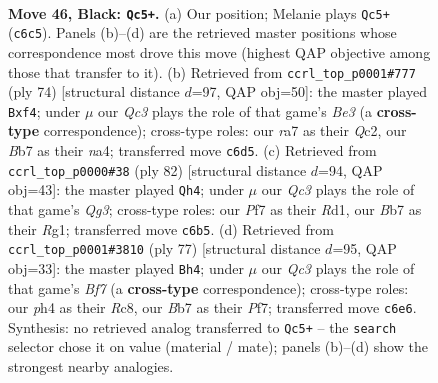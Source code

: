 \documentclass[11pt]{article}
\begin{document}
\clearpage

\begin{figure}[p]\centering
\begin{subfigure}{0.46\textwidth}\centering
\resizebox{\linewidth}{!}{%
\newchessgame
\chessboard[
  setfen={1r2r3/Rb3p1k/1pq2Bp1/8/7P/1P3Q2/2PN4/R2B2K1 b - - 6 46},
  showmover=false,
  pgfstyle=straightmove, color=movearrow, markmove={c6-c5}
]}
\caption{}
\end{subfigure}\hfill
\begin{subfigure}{0.46\textwidth}\centering
\resizebox{\linewidth}{!}{%
\newchessgame
\chessboard[
  setfen={r3r1k1/1R6/3ppq1p/8/n1P1Pb2/4B3/2Q3B1/1R4K1 w - - 0 38},
  showmover=false,
  pgfstyle=straightmove, color=movearrow, markmove={e3-f4}
]}
\caption{}
\end{subfigure}
\\[4pt]
\begin{subfigure}{0.46\textwidth}\centering
\resizebox{\linewidth}{!}{%
\newchessgame
\chessboard[
  setfen={5r1k/2p3b1/7p/p3q3/P1B5/2P2pQ1/1r3P1P/3R2RK w - - 15 42},
  showmover=false,
  pgfstyle=straightmove, color=movearrow, markmove={g3-h4}
]}
\caption{}
\end{subfigure}\hfill
\begin{subfigure}{0.46\textwidth}\centering
\resizebox{\linewidth}{!}{%
\newchessgame
\chessboard[
  setfen={r1r3k1/5pp1/p2p4/3P3q/Pp2P3/5R2/R1B1NbK1/3Q4 b - - 1 39},
  showmover=false,
  pgfstyle=straightmove, color=movearrow, markmove={f2-h4}
]}
\caption{}
\end{subfigure}
\caption{\textbf{Move 46, Black: \texttt{Qc5+}.} (a) Our position; Melanie plays \texttt{Qc5+} (\texttt{c6c5}). Panels (b)--(d) are the retrieved master positions whose correspondence most drove this move (highest QAP objective among those that transfer to it). (b) Retrieved from \texttt{ccrl\_top\_p0001\#777} (ply 74) [structural distance $d$=97, QAP obj=50]: the master played \texttt{Bxf4}; under $\mu$ our \emph{Qc3} plays the role of that game's \emph{Be3} (a \textbf{cross-type} correspondence); cross-type roles: our \emph{r}a7 as their \emph{Q}c2, our \emph{B}b7 as their \emph{n}a4; transferred move \texttt{c6d5}. (c) Retrieved from \texttt{ccrl\_top\_p0000\#38} (ply 82) [structural distance $d$=94, QAP obj=43]: the master played \texttt{Qh4}; under $\mu$ our \emph{Qc3} plays the role of that game's \emph{Qg3}; cross-type roles: our \emph{P}f7 as their \emph{R}d1, our \emph{B}b7 as their \emph{R}g1; transferred move \texttt{c6b5}. (d) Retrieved from \texttt{ccrl\_top\_p0001\#3810} (ply 77) [structural distance $d$=95, QAP obj=33]: the master played \texttt{Bh4}; under $\mu$ our \emph{Qc3} plays the role of that game's \emph{Bf7} (a \textbf{cross-type} correspondence); cross-type roles: our \emph{p}h4 as their \emph{R}c8, our \emph{B}b7 as their \emph{P}f7; transferred move \texttt{c6e6}. Synthesis: no retrieved analog transferred to \texttt{Qc5+} -- the \texttt{search} selector chose it on value (material / mate); panels (b)--(d) show the strongest nearby analogies.}
\label{fig:thought-m91}
\end{figure}
\end{document}
